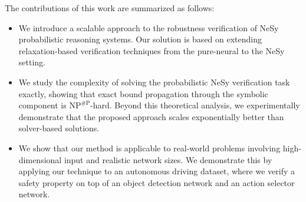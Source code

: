 The contributions of this work are summarized as follows:



\begin{itemize}
    \item We introduce a scalable approach to the robustness verification of NeSy probabilistic reasoning systems. Our solution is based on extending relaxation-based verification techniques from the pure-neural to the NeSy setting.

    \item We study the complexity of solving the probabilistic NeSy verification task exactly, showing that exact bound propagation through the symbolic component is $\mathrm{NP}^{\# \mathrm{P}}$-hard. Beyond this theoretical analysis, we experimentally demonstrate that the proposed approach scales exponentially better than solver-based solutions.
    
    \item We show that our method is applicable to real-world problems involving high-dimensional input and realistic network sizes. We demonstrate this by applying our technique to an autonomous driving dataset, where we verify a safety property on top of an object detection network and an action selector network.
\end{itemize}

